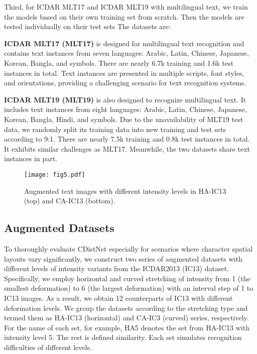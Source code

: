 Third, for ICDAR MLT17 \citep{nayef2017mlt17} and ICDAR MLT19 \citep{nayef2019mlt19} with multilingual text, we train the models based on their own training set from scratch. Then the models are tested individually on their test sets 
The datasets are:


\noindent\textbf{ICDAR MLT17 (MLT17)} \citep{nayef2017mlt17} is designed for multilingual text recognition and contains text instances from seven languages: Arabic, Latin, Chinese, Japanese, Korean, Bangla, and symbols. There are nearly 6.7k training and 1.6k test instances in total. Text instances are presented in multiple scripts, font styles, and orientations, providing a challenging scenario for text recognition systems.

\noindent\textbf{ICDAR MLT19 (MLT19)} \citep{nayef2019mlt19} is also designed to recognize multilingual text. It includes text instances from eight languages: Arabic, Latin, Chinese, Japanese, Korean, Bangla, Hindi, and symbols. Due to the unavailability of MLT19 test data, we randomly split its training data into new training and test sets according to 9:1. There are nearly 7.5k training and 0.8k test instances in total. It exhibits similar challenges as MLT17. Meanwhile, the two datasets share text instances in part.


\begin{figure*}[t]
\centering
\texttt{[image: fig5.pdf]} \caption{Augmented text images with different intensity levels in HA-IC13 (top) and CA-IC13 (bottom).}
\label{fig5:HA&CA_datasets}
\end{figure*}

\subsection{Augmented Datasets}
To thoroughly evaluate CDistNet especially for scenarios where character spatial layouts vary significantly, we construct two series of augmented datasets with different levels of intensity variants from the ICDAR2013 (IC13) dataset. Specifically, we employ horizontal and curved stretching of intensity from 1 (the smallest deformation) to 6 (the largest deformation) with an interval step of 1 to IC13 images. As a result, we obtain 12 counterparts of IC13 with different deformation levels. We group the datasets according to the stretching type and termed them as HA-IC13 (horizontal) and CA-IC3 (curved) series, respectively. For the name of each set, for example, HA5 denotes the set from HA-IC13 with intensity level 5. The rest is defined similarity. Each set simulates recognition difficulties of different levels. 

